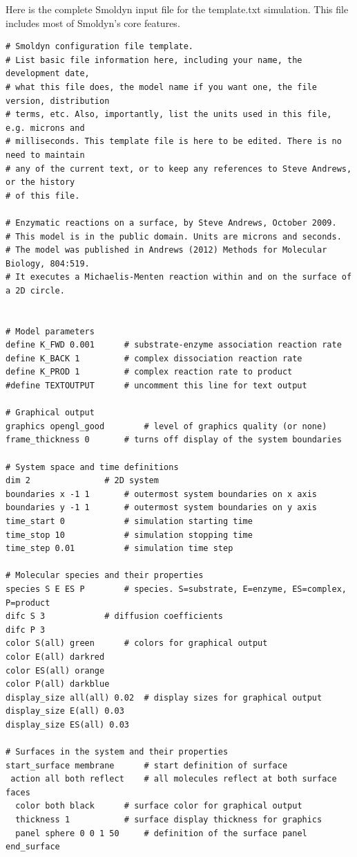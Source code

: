 \documentclass {book}
\begin{document}
Here is the complete Smoldyn input file for the template.txt simulation. This file includes most of Smoldyn's core features.

\begin{lstlisting}[style=SSAC]
# Smoldyn configuration file template.
# List basic file information here, including your name, the development date,
# what this file does, the model name if you want one, the file version, distribution
# terms, etc. Also, importantly, list the units used in this file, e.g. microns and
# milliseconds. This template file is here to be edited. There is no need to maintain
# any of the current text, or to keep any references to Steve Andrews, or the history
# of this file.

# Enzymatic reactions on a surface, by Steve Andrews, October 2009.
# This model is in the public domain. Units are microns and seconds.
# The model was published in Andrews (2012) Methods for Molecular Biology, 804:519.
# It executes a Michaelis-Menten reaction within and on the surface of a 2D circle.


# Model parameters
define K_FWD 0.001		# substrate-enzyme association reaction rate
define K_BACK 1			# complex dissociation reaction rate
define K_PROD 1			# complex reaction rate to product
#define TEXTOUTPUT		# uncomment this line for text output

# Graphical output
graphics opengl_good		# level of graphics quality (or none)
frame_thickness 0		# turns off display of the system boundaries

# System space and time definitions
dim 2				# 2D system
boundaries x -1 1		# outermost system boundaries on x axis
boundaries y -1 1		# outermost system boundaries on y axis
time_start 0			# simulation starting time
time_stop 10			# simulation stopping time
time_step 0.01			# simulation time step

# Molecular species and their properties
species S E ES P		# species. S=substrate, E=enzyme, ES=complex, P=product
difc S 3			# diffusion coefficients
difc P 3
color S(all) green		# colors for graphical output
color E(all) darkred
color ES(all) orange
color P(all) darkblue
display_size all(all) 0.02	# display sizes for graphical output
display_size E(all) 0.03
display_size ES(all) 0.03

# Surfaces in the system and their properties
start_surface membrane		# start definition of surface
 action all both reflect	# all molecules reflect at both surface faces
  color both black		# surface color for graphical output
  thickness 1			# surface display thickness for graphics
  panel sphere 0 0 1 50		# definition of the surface panel
end_surface


\end{lstlisting}
\end{document}
